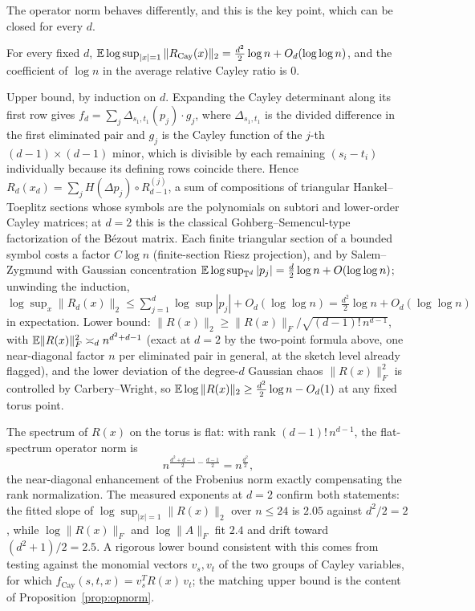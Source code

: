 The operator norm behaves differently, and this is the key point, which can be closed for
every $d$.

\begin{proposition}\label{prop:opnorm}
  For every fixed $d$,
  $\mathbb{E}\log\sup_{|x|=1}\|R_{\mathrm{Cay}}(x)\|_2 = \frac{d^2}2\log n + O_d(\log\log n)$, and
  the coefficient of $\log n$ in the average relative Cayley ratio is $0$.
\end{proposition}

\proofsketch
Upper bound, by induction on $d$. Expanding the Cayley determinant along its first row
gives $f_d = \sum_j\Delta_{s_1,t_1}(p_j)\cdot g_j$, where $\Delta_{s_1,t_1}$ is the divided
difference in the first eliminated pair and $g_j$ is the Cayley function of the $j$-th
$(d-1)\times(d-1)$ minor, which is divisible by each remaining $(s_i-t_i)$ individually
because its defining rows coincide there. Hence
$R_d(x_d) = \sum_jH(\Delta p_j)\circ R_{d-1}^{(j)}$, a sum of compositions of triangular
Hankel--Toeplitz sections whose symbols are the polynomials on subtori and lower-order
Cayley matrices; at $d=2$ this is the classical Gohberg--Semencul-type factorization of the
B\'ezout matrix. Each finite triangular section of a bounded symbol costs a factor
$C\log n$ (finite-section Riesz projection), and by Salem--Zygmund with Gaussian
concentration $\mathbb{E}\log\sup_{\mathbb T^d}|p_j| = \frac d2\log n + O(\log\log n)$; unwinding
the induction,
$\log\sup_x\|R_d(x)\|_2\le\sum_{j=1}^d\log\sup|p_j| + O_d(\log\log n)
= \frac{d^2}2\log n + O_d(\log\log n)$ in expectation. Lower bound:
$\|R(x)\|_2\ge\|R(x)\|_F/\sqrt{(d-1)!\,n^{d-1}}$, with
$\mathbb{E}\|R(x)\|_F^2\asymp_dn^{d^2+d-1}$ (exact at $d=2$ by the two-point formula above, one
near-diagonal factor $n$ per eliminated pair in general, at the sketch level already
flagged), and the lower deviation of the degree-$d$ Gaussian chaos $\|R(x)\|_F^2$ is
controlled by Carbery--Wright, so
$\mathbb{E}\log\|R(x)\|_2\ge\frac{d^2}2\log n - O_d(1)$ at any fixed torus point.
\endproof

The spectrum of $R(x)$ on the torus is flat: with rank $(d-1)!\,n^{d-1}$, the
flat-spectrum operator norm is
\[
  n^{\frac{d^2+d-1}2 - \frac{d-1}2} = n^{\frac{d^2}2},
\]
the near-diagonal enhancement of the Frobenius norm exactly compensating the rank
normalization. The measured exponents at $d=2$ confirm both statements: the fitted slope
of $\log\sup_{|x|=1}\|R(x)\|_2$ over $n\le24$ is $2.05$ against $d^2/2 = 2$, while
$\log\|R(x)\|_F$ and $\log\|A\|_F$ fit $2.4$ and drift toward $(d^2+1)/2 = 2.5$. A
rigorous lower bound consistent with this comes from testing against the monomial vectors
$v_s,v_t$ of the two groups of Cayley variables, for which
$f_{\mathrm{Cay}}(s,t,x) = v_s^TR(x)\,v_t$; the matching upper bound is the content of
Proposition~\ref{prop:opnorm}.

